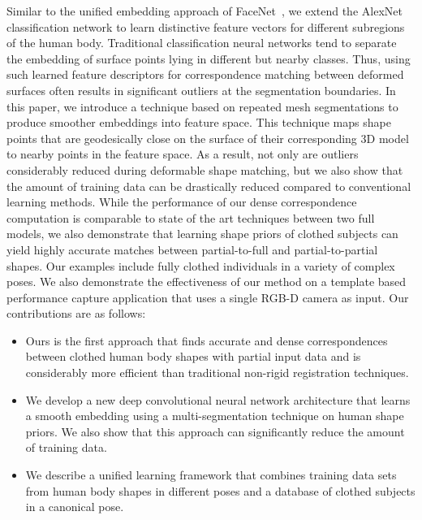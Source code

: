 \documentclass[10pt,twocolumn,letterpaper]{article}
\begin{document}
Similar to the unified embedding approach of FaceNet~\cite{SchroffKP15}, we extend the AlexNet~\cite{NIPS2012_4824} classification network to learn distinctive feature vectors for different subregions of the human body.
Traditional classification neural networks tend to separate the embedding of surface points lying in different but nearby classes. Thus, using such learned feature descriptors for correspondence matching between deformed surfaces often results in significant outliers at the segmentation boundaries. In this paper, we introduce a technique based on repeated mesh segmentations to produce smoother embeddings into feature space. This technique maps shape points that are geodesically close on the surface of their corresponding 3D model to nearby points in the feature space. As a result, not only are outliers considerably reduced during deformable shape matching, but we also show that the amount of training data can be drastically reduced compared to conventional learning methods. While the performance of our dense correspondence computation is comparable to state of the art techniques between two full models, we also demonstrate that learning shape priors of clothed subjects can yield highly accurate matches between partial-to-full and partial-to-partial shapes. Our examples include fully clothed individuals in a variety of complex poses.%
We also demonstrate the effectiveness of our method on a template based performance capture application that uses a single RGB-D camera as input. Our contributions are as follows:
\begin{itemize}
	\item Ours is the first approach that finds accurate and dense correspondences between clothed human body shapes with partial input data and is considerably more efficient than traditional non-rigid registration techniques.
	\item We develop a new deep convolutional neural network architecture that learns a smooth embedding using a multi-segmentation technique on human shape priors. We also show that this approach can significantly reduce the amount of training data.
	\item We describe a unified learning framework that combines training data sets from human body shapes in different poses and a database of clothed subjects in a canonical pose. %
\end{itemize}
\end{document}
